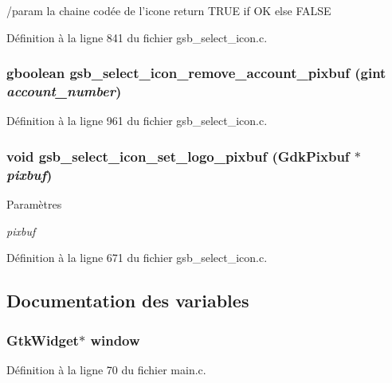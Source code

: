 /param la chaine codée de l'icone return TRUE if OK else FALSE 

Définition à la ligne 841 du fichier gsb\_\-select\_\-icon.c.

\subsubsection[{gsb\_\-select\_\-icon\_\-remove\_\-account\_\-pixbuf}]{\setlength{\rightskip}{0pt plus 5cm}gboolean gsb\_\-select\_\-icon\_\-remove\_\-account\_\-pixbuf (gint {\em account\_\-number})}\label{gsb__select__icon_8c_a0582db6d9af709919cc700762ad20bf8}


Définition à la ligne 961 du fichier gsb\_\-select\_\-icon.c.

\subsubsection[{gsb\_\-select\_\-icon\_\-set\_\-logo\_\-pixbuf}]{\setlength{\rightskip}{0pt plus 5cm}void gsb\_\-select\_\-icon\_\-set\_\-logo\_\-pixbuf (GdkPixbuf $\ast$ {\em pixbuf})}\label{gsb__select__icon_8c_aea7e10723177974aa14adf95f95a7273}

\begin{DoxyParams}{Paramètres}
\item[{\em pixbuf}]\end{DoxyParams}


Définition à la ligne 671 du fichier gsb\_\-select\_\-icon.c.



\subsection{Documentation des variables}
\subsubsection[{window}]{\setlength{\rightskip}{0pt plus 5cm}GtkWidget$\ast$ {\bf window}}\label{gsb__select__icon_8c_a3d346c08cf2d67c388caabffb412b293}


Définition à la ligne 70 du fichier main.c.

